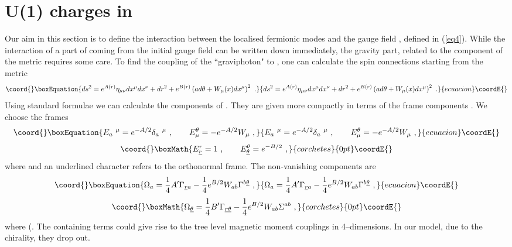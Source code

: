 \documentclass[a4paper,12pt]{article}
\begin{document}
\section{ U(1) charges in \coordHE{}}
Our aim in this section is to define the interaction between the
localised fermionic modes and the gauge field \coordHE{}, defined in
(\ref{eq4}). While the interaction of a part of \coordHE{} coming from
the initial gauge field \coordHE{} can be written down immediately, the
gravity part, related to the component of the metric \coordHE{}
requires some care. To find the coupling of the ``graviphoton" to
\myHighlight{$\psi$}\coordHE{}, one can  calculate the spin connections \coordHE{} starting
from the metric
\begin{equation}\coord{}\boxEquation{
ds^2 = e^{A(r)} \eta_{\mu\nu} dx^\mu dx^\nu +dr^2 + e^{B(r)}
\left(ad\theta+W_{\mu}(x) dx^\mu\right)^2~.
\label{me}
}{
ds^2 = e^{A(r)} \eta_{\mu\nu} dx^\mu dx^\nu +dr^2 + e^{B(r)}
\left(ad\theta+W_{\mu}(x) dx^\mu\right)^2~.
}{ecuacion}\coordE{}\end{equation}
Using standard formulae we can calculate the components of
\coordHE{}.  They are given more compactly in terms of the frame
components \coordHE{}.  We choose the frames
\begin{equation}\coord{}\boxEquation{
 E_a\ ^\mu = e^{-A/2} \delta_a\ ^\mu~,\qquad E^\theta_\mu =
-e^{-A/2}W_\mu~,
\label{conn}
}{
 E_a\ ^\mu = e^{-A/2} \delta_a\ ^\mu~,\qquad E^\theta_\mu =
-e^{-A/2}W_\mu~,
}{ecuacion}\coordE{}\end{equation}
\[\coord{}\boxMath{
 E^r_{\underline r} = 1~,\qquad E^\theta_{\underline\theta} =
e^{-B/2}~,
}{corchetes}{0pt}\coordE{}\]
where \coordHE{} and an underlined character refers to the
orthonormal frame.  The non-vanishing components are
\begin{equation}\coord{}\boxEquation{
\Omega_a = {1\over 4} A' \Gamma_{{\underline r} a} -
{1\over 4} e^{B/2} W_{ab}
\Gamma^{b\underline\theta}~,
}{
\Omega_a = {1\over 4} A' \Gamma_{{\underline r} a} -
{1\over 4} e^{B/2} W_{ab}
\Gamma^{b\underline\theta}~,
}{ecuacion}\coordE{}\end{equation}
\[\coord{}\boxMath{
\nonumber
\Omega_{\underline\theta} = {1\over 4} B' \Gamma_{{\underline r} 
\underline\theta}
-{1\over 4} e^{B/2} W_{ab}
\Sigma^{ab}~,
}{corchetes}{0pt}\coordE{}\]
where \coordHE{} (\coordHE{}. The \coordHE{} containing terms could give
rise to the tree level magnetic moment couplings in 4--dimensions. 
In our model, due to the \coordHE{} chirality, they drop out.
\end{document}
